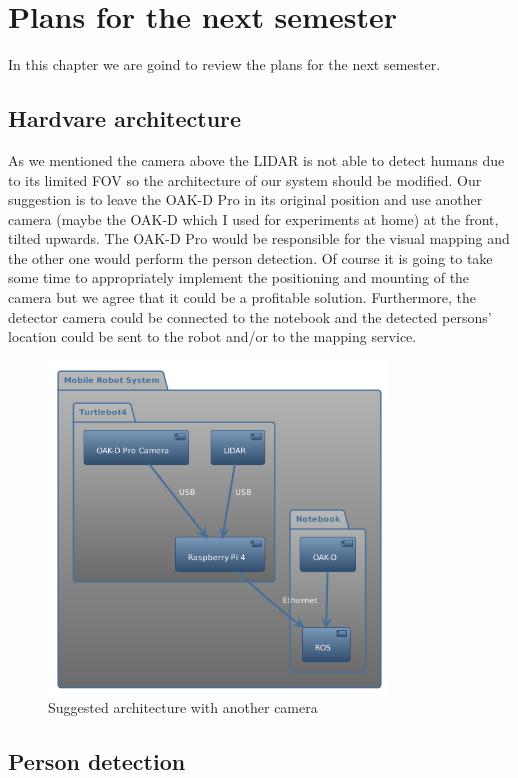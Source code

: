 \chapter{Plans for the next semester} \label{future_plans}

In this chapter we are goind to review the plans for the next semester.

\section{Hardvare architecture}

As we mentioned the camera above the LIDAR is not able to detect humans due to its limited FOV so the architecture of our system should be modified. Our suggestion is to leave the OAK-D Pro in its original position and use another camera (maybe the OAK-D which I used for experiments at home) at the front, tilted upwards. The OAK-D Pro would be responsible for the visual mapping and the other one would perform the person detection. Of course it is going to take some time to appropriately implement the positioning and mounting of the camera but we agree that it could be a profitable solution. Furthermore, the detector camera could be connected to the notebook and the detected persons' location could be sent to the robot and/or to the mapping service.

\begin{figure}[H]
    \centering
    \includegraphics[width=90mm, keepaspectratio]{figures/suggested_architecture.png}
    \caption{Suggested architecture with another camera}
    \label{fig:suggested_architecture}
\end{figure}

\section{Person detection}

